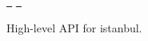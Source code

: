 \href{https://greenkeeper.io/}{\texttt{ }} \href{https://travis-ci.org/istanbuljs/istanbul-api}{\texttt{ }}

High-\/level API for istanbul. 